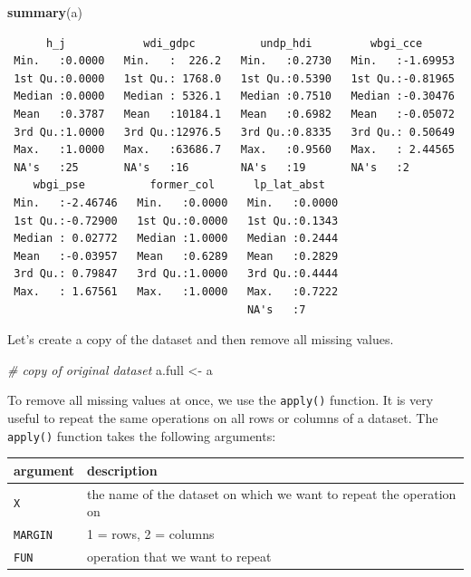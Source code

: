 \documentclass[]{article}
\newenvironment{Shaded}{\begin{snugshade}}{\end{snugshade}}
\newcommand{\KeywordTok}[1]{\textcolor[rgb]{0.13,0.29,0.53}{\textbf{#1}}}
\newcommand{\StringTok}[1]{\textcolor[rgb]{0.31,0.60,0.02}{#1}}
\newcommand{\CommentTok}[1]{\textcolor[rgb]{0.56,0.35,0.01}{\textit{#1}}}
\newcommand{\NormalTok}[1]{#1}
\theoremstyle{definition}
\theoremstyle{definition}
\theoremstyle{definition}
\theoremstyle{remark}
\begin{document}
\begin{Shaded}
\begin{Highlighting}[]
\KeywordTok{summary}\NormalTok{(a)}
\end{Highlighting}
\end{Shaded}

\begin{verbatim}
      h_j            wdi_gdpc          undp_hdi         wbgi_cce       
 Min.   :0.0000   Min.   :  226.2   Min.   :0.2730   Min.   :-1.69953  
 1st Qu.:0.0000   1st Qu.: 1768.0   1st Qu.:0.5390   1st Qu.:-0.81965  
 Median :0.0000   Median : 5326.1   Median :0.7510   Median :-0.30476  
 Mean   :0.3787   Mean   :10184.1   Mean   :0.6982   Mean   :-0.05072  
 3rd Qu.:1.0000   3rd Qu.:12976.5   3rd Qu.:0.8335   3rd Qu.: 0.50649  
 Max.   :1.0000   Max.   :63686.7   Max.   :0.9560   Max.   : 2.44565  
 NA's   :25       NA's   :16        NA's   :19       NA's   :2         
    wbgi_pse          former_col      lp_lat_abst    
 Min.   :-2.46746   Min.   :0.0000   Min.   :0.0000  
 1st Qu.:-0.72900   1st Qu.:0.0000   1st Qu.:0.1343  
 Median : 0.02772   Median :1.0000   Median :0.2444  
 Mean   :-0.03957   Mean   :0.6289   Mean   :0.2829  
 3rd Qu.: 0.79847   3rd Qu.:1.0000   3rd Qu.:0.4444  
 Max.   : 1.67561   Max.   :1.0000   Max.   :0.7222  
                                     NA's   :7       
\end{verbatim}

Let's create a copy of the dataset and then remove all missing values.

\begin{Shaded}
\begin{Highlighting}[]
\CommentTok{# copy of original dataset}
\NormalTok{a.full <-}\StringTok{ }\NormalTok{a}
\end{Highlighting}
\end{Shaded}

To remove all missing values at once, we use the \texttt{apply()}
function. It is very useful to repeat the same operations on all rows or
columns of a dataset. The \texttt{apply()} function takes the following
arguments:

\begin{longtable}[]{@{}ll@{}}
\toprule
argument & description\tabularnewline
\midrule
\endhead
\texttt{X} & the name of the dataset on which we want to repeat the
operation on\tabularnewline
\texttt{MARGIN} & 1 = rows, 2 = columns\tabularnewline
\texttt{FUN} & operation that we want to repeat\tabularnewline
\bottomrule
\end{longtable}
\end{document}
